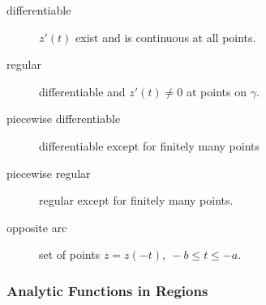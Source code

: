 





\begin{description}
	\item[differentiable] $z'(t)$ exist and is continuous at all points.
	\item[regular] differentiable and $z'(t) \ne 0$ at points on $\gamma$.
	\item[piecewise differentiable] differentiable except for finitely many points
	\item[piecewise regular] regular except for finitely many points.
	\item[opposite arc] set of points $z = z(-t),\ -b \le t \le -a$.
\end{description}
\subsubsection{Analytic Functions in Regions}
